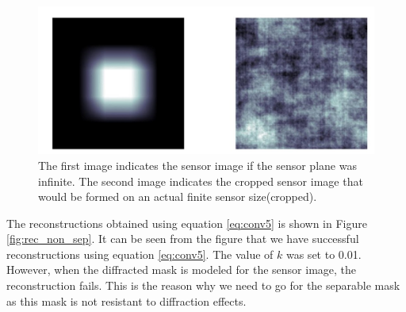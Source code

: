 \begin{figure}[ht]
\includegraphics[scale = 0.50]{pics/sensorCropped}
\caption{The first image indicates the sensor image if the sensor plane was infinite. The second image indicates the cropped sensor image that would be formed on an actual finite sensor size(cropped).}
\label{fig:moon_image}
\end{figure}
The reconstructions obtained using equation \ref{eq:conv5} is shown in Figure \ref{fig:rec_non_sep}. It can be seen from the figure that we have successful reconstructions using equation \ref{eq:conv5}. The value of $k $ was set to 0.01.
However, when the diffracted mask is modeled for the sensor image, the reconstruction fails. This is the reason why we need to go for the separable mask as this mask is not resistant to diffraction effects. 
